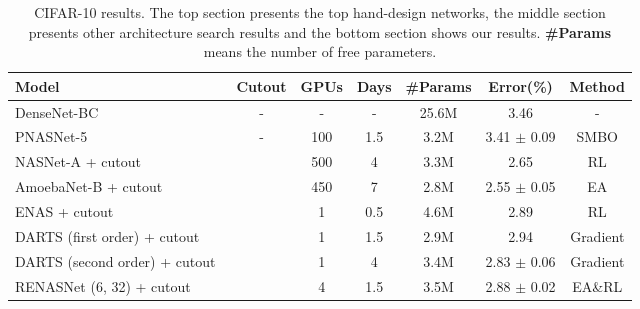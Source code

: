\documentclass[10pt,twocolumn,letterpaper]{article}
\begin{document}
  \begin{table*}[!hbt] 
  \centering  
    \caption{CIFAR-10 results. The top section presents the top hand-design networks, the middle section presents other architecture search results and the bottom section shows our results. \textbf{\#Params} means the number of free parameters.} \label{tab:1}
   \begin{threeparttable}
  \begin{tabular}{ l  c c c  c  c c}
  \hline
      \textbf{Model} 					     					& \textbf{Cutout}		& \textbf{GPUs} & \textbf{Days} & \textbf{\#Params} 	& \textbf{Error(\%)}  & \textbf{Method}\\  
      \hline
      DenseNet-BC~\cite{huang2017densely} 	& -			& - 						 &  - 		& 25.6M 							& 3.46 							  &  - \\  
      \hline
      PNASNet-5~\cite{liu2017progressive}		& -	 		& 100&1.5 						& 3.2M								& 3.41 $\pm$ 0.09 		 &		SMBO\\
      NASNet-A + cutout~\cite{zoph2017learning} 	& \checkmark & 500					&4 		& 3.3M								& 2.65 							 &		RL\\
	  AmoebaNet-B + cutout~\cite{Real2018Regularized} & \checkmark & 450&7 					& 2.8M 							& 2.55 $\pm$ 0.05 		 &		EA\\
	  ENAS + cutout~\cite{pham2018efficient}			& \checkmark & 1&0.5							& 4.6M								& 2.89 							 &		RL\\
	  DARTS (first order) + cutout~\cite{DBLP:journals/corr/abs-1806-09055} & \checkmark & 1&1.5		& 2.9M								&  2.94 & Gradient \\
	  DARTS (second order) + cutout~\cite{DBLP:journals/corr/abs-1806-09055} & \checkmark & 1&4		& 3.4M								&  2.83 $\pm$ 0.06 & Gradient\\
      \hline
      RENASNet (6, 32) + cutout									& \checkmark & 4&1.5							&	3.5M								&	2.88	$\pm$ 0.02		 &		EA\&RL\\
      \hline
  \end{tabular}
  
    \end{threeparttable}
   \end{table*}
\end{document}
